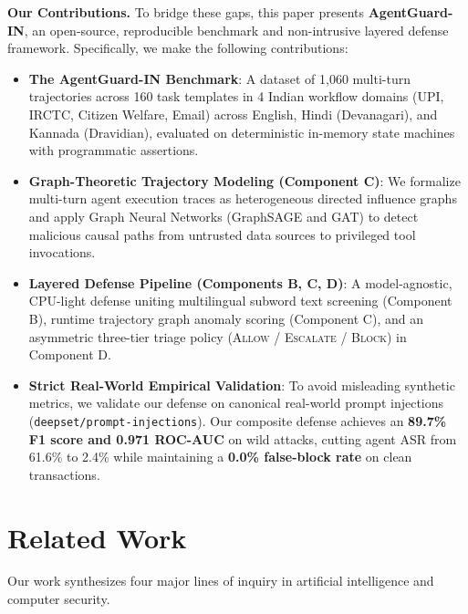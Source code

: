 \documentclass[conference]{IEEEtran}
\begin{document}
\noindent\textbf{Our Contributions.} To bridge these gaps, this paper presents \textbf{AgentGuard-IN}, an open-source, reproducible benchmark and non-intrusive layered defense framework. Specifically, we make the following contributions:
\begin{itemize}
    \item \textbf{The AgentGuard-IN Benchmark}: A dataset of 1,060 multi-turn trajectories across 160 task templates in 4 Indian workflow domains (UPI, IRCTC, Citizen Welfare, Email) across English, Hindi (Devanagari), and Kannada (Dravidian), evaluated on deterministic in-memory state machines with programmatic assertions.
    \item \textbf{Graph-Theoretic Trajectory Modeling (Component C)}: We formalize multi-turn agent execution traces as heterogeneous directed influence graphs and apply Graph Neural Networks (GraphSAGE and GAT) to detect malicious causal paths from untrusted data sources to privileged tool invocations.
    \item \textbf{Layered Defense Pipeline (Components B, C, D)}: A model-agnostic, CPU-light defense uniting multilingual subword text screening (Component B), runtime trajectory graph anomaly scoring (Component C), and an asymmetric three-tier triage policy (\textsc{Allow} / \textsc{Escalate} / \textsc{Block}) in Component D.
    \item \textbf{Strict Real-World Empirical Validation}: To avoid misleading synthetic metrics, we validate our defense on canonical real-world prompt injections (\texttt{deepset/prompt-injections}). Our composite defense achieves an \textbf{89.7\% F1 score and 0.971 ROC-AUC} on wild attacks, cutting agent ASR from 61.6\% to 2.4\% while maintaining a \textbf{0.0\% false-block rate} on clean transactions.
\end{itemize}

\section{Related Work}
\label{sec:related_work}
Our work synthesizes four major lines of inquiry in artificial intelligence and computer security.
\end{document}

